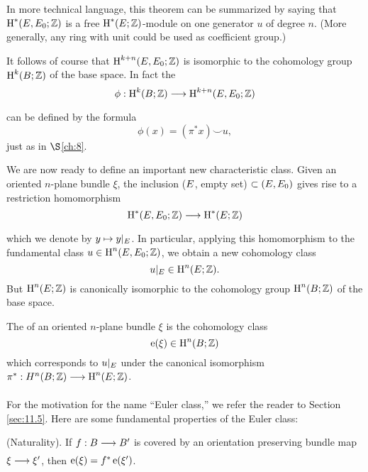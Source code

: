 \documentclass[../main]{subfiles}
\begin{document}
In more technical language, this theorem can be summarized by saying that $\operatorname{H}^{*}(E, E_{0} ; \mathbb{Z})$ is a free $\operatorname{H}^{*}(E ; \mathbb{Z})$-module on one generator $u$ of degree $n$. (More generally, any ring with unit could be used as coefficient group.)

It follows of course that $\operatorname{H}^{k+n}(E, E_{0} ; \mathbb{Z})$ is isomorphic to the cohomology group $\operatorname{H}^{k}(B ; \mathbb{Z})$ of the base space. In fact the 
\[
\phi: \homology^{k}(\base ; \mathbb{Z}) \varrightarrow{} \homology^{k+n}(\total, \total_{0} ; \mathbb{Z})
\]
can be defined by the formula
\[
\phi(x)=(\pi^{*} x) \smile u,
\]
just as in $\S$\ref{ch:8}.

We are now ready to define an important new characteristic class. Given an oriented $n$-plane bundle $\xi$, the inclusion ($E$, empty set) $\subset(E, E_{0})$ gives rise to a restriction homomorphism
\[
\homology^{*}(\total, \total_{0} ; \mathbb{Z}) \varrightarrow{} \homology^{*}(\total ; \mathbb{Z})
\]
which we denote by $y \mapsto y |_{E}$. In particular, applying this homomorphism to the fundamental class $u \in \operatorname{H}^{n}(E, E_{0} ; \mathbb{Z})$, we obtain a new cohomology class
\[
u |_{E} \in \operatorname{H}^{n}(E ; \mathbb{Z}) .
\]
But $\operatorname{H}^{n}(E ; \mathbb{Z})$ is canonically isomorphic to the cohomology group $\operatorname{H}^{n}(B ; \mathbb{Z})$ of the base space.

\begin{definition} The  of an oriented $n$-plane bundle $\xi$ is the cohomology class
\[
\operatorname{e}(\xi) \in \operatorname{H}^{n}(B ; \mathbb{Z})
\]
which corresponds to $u |_{E}$ under the canonical isomorphism \newline$\pi^{*}: H^{n}(\base ; \mathbb{Z}) \varrightarrow{}\homology^{n}(\total ; \mathbb{Z})$.

\end{definition}

For the motivation for the name ``Euler class,'' we refer the reader to Section \ref{sec:11.5}. Here are some fundamental properties of the Euler class:
\setcounter{property}{1}
\renewcommand{\theproperty}{\thechapter.\arabic{property}}
\begin{property}\label{pro:09.02} (Naturality). If $f: \base \varrightarrow{} \base^{\prime}$ is covered by an orientation preserving bundle map $\xi \varrightarrow{} \xi^{\prime}$, then $\operatorname{e}(\xi)=f^{*} \operatorname{e}(\xi^{\prime})$.

\end{property}
\end{document}
